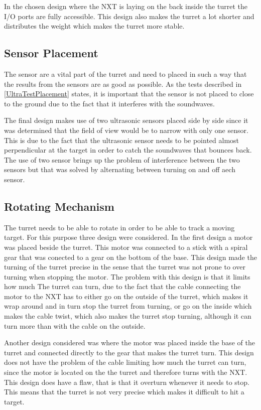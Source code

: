 In the chosen design where the NXT is laying on the back inside the turret the
I/O ports are fully accessible. This design also makes the turret a lot shorter
and distributes the weight which makes the turret more stable. 
\subsection{Sensor Placement}
The sensor are a vital part of the turret and need to placed in such a way that
the results from the sensors are as good as possible. As the tests described in
\autoref{UltraTestPlacement} states, it is important that the sensor is not
placed to close to the ground due to the fact that it interferes with the
soundwaves.\nl

The final design makes use of two ultrasonic sensors placed side by side since
it was determined that the field of view would be to narrow with only one
sensor. This is due to the fact that the ultrasonic sensor needs to be pointed
almost perpendicular at the target in order to catch the soundwaves that bounces
back. The use of two sensor brings up the problem of interference between the
two sensors but that was solved by alternating between turning on and off aech
sensor.

\subsection{Rotating Mechanism}
The turret needs to be able to rotate in order to be able to track a moving
target. For this purpose three design were considered. In the first design a
motor was placed beside the turret. This motor was connected to a stick with a
spiral gear that was conected to a gear on the bottom of the base. This design
made the turning of the turret precise in the sense that the turret was not
prone to over turning when stopping the motor. The problem with this design is
that it limits how much The turret can turn, due to the fact that the cable
connecting the motor to the NXT has to either go on the outside of the turret,
which makes it wrap around and in turn stop the turret from turning, or go on
the inside which makes the cable twist, which also makes the turret stop
turning, although it can turn more than with the cable on the outside.\nl

Another design considered was where the motor was placed inside the base of the
turret and connected directly to the gear that makes the turret turn. This
design does not have the problem of the cable limiting how much the turret can
turn, since the motor is located on the the turret and therefore turns with the
NXT. This design does have a flaw, that is that it overturn whenever it needs to
stop. This means that the turret is not very precise which makes it difficult to
hit a target.\nl

